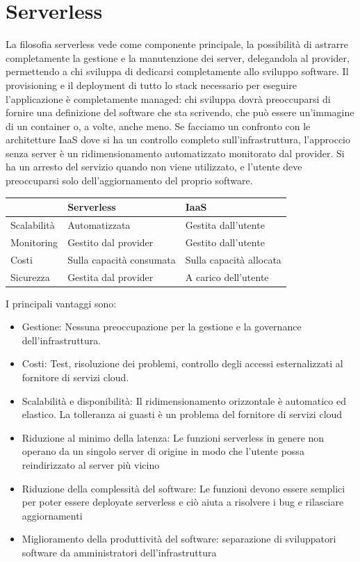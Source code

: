 \documentclass{article}
\begin{document}
		\section{Serverless}
		La filosofia serverless vede come componente principale, la possibilità di astrarre completamente la gestione e la manutenzione dei server, delegandola al provider, permettendo a chi sviluppa di dedicarsi completamente allo sviluppo software. Il provisioning e il deployment di tutto lo stack necessario per eseguire l’applicazione è completamente managed: chi sviluppa dovrà preoccuparsi di fornire una definizione
		del software che sta scrivendo, che può essere un’immagine di un container o, a volte, anche meno.
		Se facciamo un confronto con le architetture IaaS dove si ha un controllo completo sull'infrastruttura, l'approccio senza server è un ridimensionamento automatizzato monitorato dal provider. Si ha un arresto del servizio quando non viene utilizzato, e l'utente deve preoccuparsi solo dell'aggiornamento del proprio software.
		\begin{table}[ht]
			\centering
			\begin{tabular}{|l|l|l|}
			\hline
			            & Serverless               & IaaS                    \\ \hline
			Scalabilità & Automatizzata            & Gestita dall'utente     \\ \hline
			Monitoring  & Gestito dal provider     & Gestito dall'utente     \\ \hline
			Costi       & Sulla capacità consumata & Sulla capacità allocata \\ \hline
			Sicurezza   & Gestita dal provider     & A carico dell'utente    \\ \hline
			\end{tabular}
		\end{table}
		I principali vantaggi sono:
		\begin{itemize}
		    \item Gestione: Nessuna preoccupazione per la gestione e la governance dell'infrastruttura.
		    \item Costi: Test, risoluzione dei problemi, controllo degli accessi esternalizzati al fornitore di servizi cloud.
		    \item Scalabilità e disponibilità: Il ridimensionamento orizzontale è automatico ed elastico. La tolleranza ai guasti è un problema del fornitore di servizi cloud
		    \item Riduzione al minimo della latenza: Le funzioni serverless in genere non operano da un singolo server di origine in modo che l'utente possa reindirizzato al server più vicino
		    \item Riduzione della complessità del software: Le funzioni devono essere semplici per poter essere deployate serverless e ciò aiuta a risolvere i bug e rilasciare aggiornamenti
		    \item Miglioramento della produttività del software: separazione di sviluppatori software da amministratori dell'infrastruttura
		\end{itemize}
\end{document}
